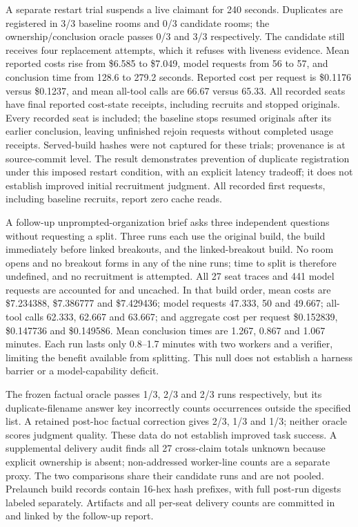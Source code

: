 A separate restart trial suspends a live claimant for 240 seconds. Duplicates are registered in 3/3 baseline rooms and 0/3 candidate rooms; the ownership/conclusion oracle passes 0/3 and 3/3 respectively. The candidate still receives four replacement attempts, which it refuses with liveness evidence. Mean reported costs rise from \$6.585 to \$7.049, model requests from 56 to 57, and conclusion time from 128.6 to 279.2 seconds. Reported cost per request is \$0.1176 versus \$0.1237, and mean all-tool calls are 66.67 versus 65.33. All recorded seats have final reported cost-state receipts, including recruits and stopped originals. Every recorded seat is included; the baseline stops resumed originals after its earlier conclusion, leaving unfinished rejoin requests without completed usage receipts. Served-build hashes were not captured for these trials; provenance is at source-commit level. The result demonstrates prevention of duplicate registration under this imposed restart condition, with an explicit latency tradeoff; it does not establish improved initial recruitment judgment. All recorded first requests, including baseline recruits, report zero cache reads.


A follow-up unprompted-organization brief asks three independent questions without requesting a split. Three runs each use the original build, the build immediately before linked breakouts, and the linked-breakout build. No room opens and no breakout forms in any of the nine runs; time to split is therefore undefined, and no recruitment is attempted. All 27 seat traces and 441 model requests are accounted for and uncached. In that build order, mean costs are \$7.234388, \$7.386777 and \$7.429436; model requests 47.333, 50 and 49.667; all-tool calls 62.333, 62.667 and 63.667; and aggregate cost per request \$0.152839, \$0.147736 and \$0.149586. Mean conclusion times are 1.267, 0.867 and 1.067 minutes. Each run lasts only 0.8--1.7 minutes with two workers and a verifier, limiting the benefit available from splitting. This null does not establish a harness barrier or a model-capability deficit.

The frozen factual oracle passes 1/3, 2/3 and 2/3 runs respectively, but its duplicate-filename answer key incorrectly counts occurrences outside the specified list. A retained post-hoc factual correction gives 2/3, 1/3 and 1/3; neither oracle scores judgment quality. These data do not establish improved task success. A supplemental delivery audit finds all 27 cross-claim totals unknown because explicit ownership is absent; non-addressed worker-line counts are a separate proxy. The two comparisons share their candidate runs and are not pooled. Prelaunch build records contain 16-hex hash prefixes, with full post-run digests labeled separately. Artifacts and all per-seat delivery counts are committed in  and linked by the follow-up report.

